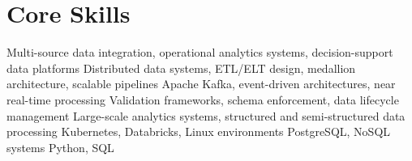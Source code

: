 \section*{Core Skills}
\vspace{-0.15em}

 {Multi-source data integration, operational analytics systems, decision-support data platforms}
 {Distributed data systems, ETL/ELT design, medallion architecture, scalable pipelines}
 {Apache Kafka, event-driven architectures, near real-time processing}
 {Validation frameworks, schema enforcement, data lifecycle management}
 {Large-scale analytics systems, structured and semi-structured data processing}
 {Kubernetes, Databricks, Linux environments}
 {PostgreSQL, NoSQL systems}
 {Python, SQL}